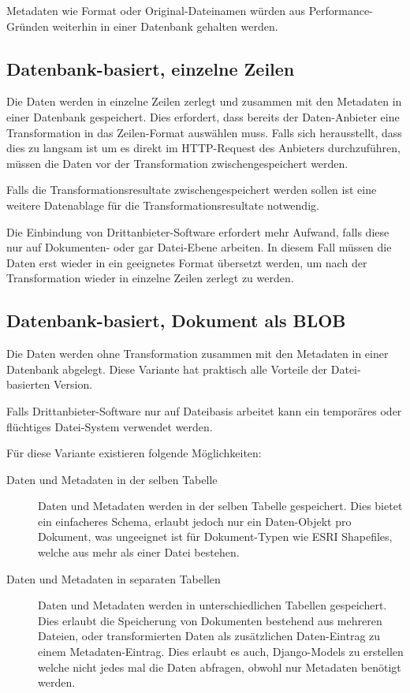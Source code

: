 Metadaten wie Format oder Original-Dateinamen würden aus Performance-Gründen weiterhin in einer Datenbank gehalten werden.

\subsection{Datenbank-basiert, einzelne Zeilen}\label{sec:pd:datenbank-records}
Die Daten werden in einzelne Zeilen zerlegt und zusammen mit den Metadaten in einer Datenbank gespeichert. Dies erfordert, dass bereits der Daten-Anbieter eine Transformation in das Zeilen-Format auswählen muss. Falls sich herausstellt, dass dies zu langsam ist um es direkt im HTTP-Request des Anbieters durchzuführen, müssen die Daten vor der Transformation zwischengespeichert werden.

Falls die Transformationsresultate zwischengespeichert werden sollen ist eine weitere Datenablage für die Transformationsresultate notwendig.

Die Einbindung von Drittanbieter-Software erfordert mehr Aufwand, falls diese nur auf Dokumenten- oder gar Datei-Ebene arbeiten. In diesem Fall müssen die Daten erst wieder in ein geeignetes Format übersetzt werden, um nach der Transformation wieder in einzelne Zeilen zerlegt zu werden.

\subsection{Datenbank-basiert, Dokument als BLOB}
Die Daten werden ohne Transformation zusammen mit den Metadaten in einer Datenbank abgelegt. Diese Variante hat praktisch alle Vorteile der Datei-basierten Version.

Falls Drittanbieter-Software nur auf Dateibasis arbeitet kann ein temporäres oder flüchtiges Datei-System verwendet werden.

Für diese Variante existieren folgende Möglichkeiten:
\begin{description}
\item[Daten und Metadaten in der selben Tabelle] Daten und Metadaten werden in der selben Tabelle gespeichert. Dies bietet ein einfacheres Schema, erlaubt jedoch nur ein Daten-Objekt pro Dokument, was ungeeignet ist für Dokument-Typen wie ESRI Shapefiles, welche aus mehr als einer Datei bestehen.
\item[Daten und Metadaten in separaten Tabellen] Daten und Metadaten werden in unterschiedlichen Tabellen gespeichert. Dies erlaubt die Speicherung von Dokumenten bestehend aus mehreren Dateien, oder transformierten Daten als zusätzlichen Daten-Eintrag zu einem Metadaten-Eintrag. Dies erlaubt es auch, Django-Models zu erstellen welche nicht jedes mal die Daten abfragen, obwohl nur Metadaten benötigt werden.
\end{description}

